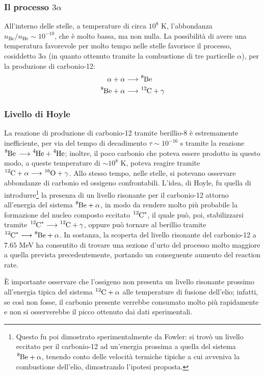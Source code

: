 \documentclass[11pt, a4paper]{scrartcl}
\theoremstyle{style}
\theoremstyle{style1}
\numberwithin{equation}{subsection}
\begin{document}
\subsubsection{Il processo $3\alpha $}
All'interno delle stelle, a temperature di circa $10^8$ K, l'abbondanza $n_\mathrm{Be} / n_\mathrm{He} \sim 10^{-10} $, che \`e molto bassa, ma non nulla.
La possibilit\`a di avere una temperatura favorevole per molto tempo nelle stelle favorisce il processo, cosiddetto $3\alpha $ (in quanto ottenuto tramite la combustione di tre particelle $\alpha $), per la produzione di carbonio-12:
\[
\begin{split}
	\alpha +\alpha  &\longrightarrow \ce{^{8}Be} \\
	\ce{^{8}Be + \alpha } &\longrightarrow \ce{^{12}C + \gamma}
\end{split}
\] 
\subsubsection{Livello di Hoyle}
La reazione di produzione di carbonio-12 tramite berillio-8 \`e estremamente inefficiente, per via del tempo di decadimento $\tau \sim 10^{-16}$ s tramite la reazione $\ce{^{8}Be \longrightarrow ^{4}He + ^{4}He}$; inoltre, il poco carbonio che poteva essere prodotto in questo modo, a queste temperature di $\sim 10^8$ K, poteva reagire tramite $\ce{^{12}C + \alpha \longrightarrow ^{16}O + \gamma}$.
Allo stesso tempo, nelle stelle, si potevano osservare abbondanze di carbonio ed ossigeno confrontabili. 
L'idea, di Hoyle, fu quella di introdurre\footnote{Questo fu poi dimostrato sperimentalmente da Fowler: si trov\`o un livello eccitato per il carbonio-12 ad un'energia prossima a quella del sistema $\ce{^{8}Be + \alpha }$, tenendo conto delle velocit\`a termiche tipiche a cui avveniva la combustione dell'elio, dimostrando l'ipotesi proposta.} la presenza di un livello risonante per il carbonio-12 attorno all'energia del sistema $\ce{^{8}Be +\alpha }$, in modo da rendere molto pi\`u probabile la formazione del nucleo composto eccitato $\ce{^{12}C^*}$, il quale pu\`o, poi, stabilizzarsi tramite $\ce{^{12}C^*} \longrightarrow \ce{^{12}C +\gamma}$, oppure pu\`o tornare al berillio tramite $\ce{^{12}C^*} \longrightarrow \ce{^{8}Be +\alpha }$.
In sostanza, la scoperta del livello risonante del carbonio-12 a $7.65$ MeV ha consentito di trovare una sezione d'urto del processo molto maggiore a quella prevista precedentemente, portando un conseguente aumento del reaction rate.

\`E importante osservare che l'ossigeno non presenta un livello risonante prossimo all'energia tipica del sistema $\ce{^{12}C + \alpha }$ alle temperature di fusione dell'elio; infatti, se cos\`i non fosse, il carbonio presente verrebbe consumato molto pi\`u rapidamente e non si osserverebbe il picco ottenuto dai dati sperimentali.
\end{document}
